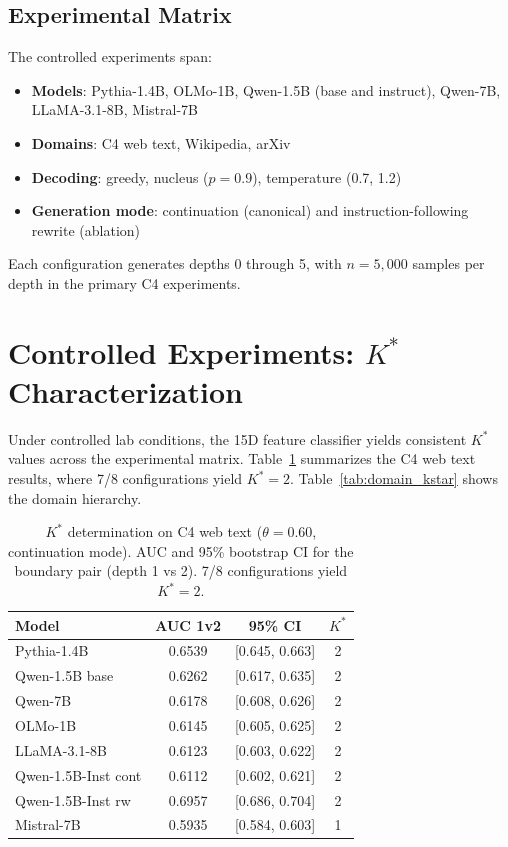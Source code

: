 \documentclass[11pt,a4paper]{article}
\begin{document}
\subsection{Experimental Matrix}

The controlled experiments span:
\begin{itemize}
    \item \textbf{Models}: Pythia-1.4B, OLMo-1B, Qwen-1.5B (base and instruct), Qwen-7B, LLaMA-3.1-8B, Mistral-7B
    \item \textbf{Domains}: C4 web text, Wikipedia, arXiv
    \item \textbf{Decoding}: greedy, nucleus ($p=0.9$), temperature (0.7, 1.2)
    \item \textbf{Generation mode}: continuation (canonical) and instruction-following rewrite (ablation)
\end{itemize}

Each configuration generates depths 0 through 5, with $n = 5{,}000$ samples per depth in the primary C4 experiments.


\section{Controlled Experiments: $K^*$ Characterization}

Under controlled lab conditions, the 15D feature classifier yields consistent $K^*$ values across the experimental matrix.
Table~\ref{tab:c4_kstar} summarizes the C4 web text results, where 7/8 configurations yield $K^*=2$.
Table~\ref{tab:domain_kstar} shows the domain hierarchy.

\begin{table}[t]
\centering
\caption{$K^*$ determination on C4 web text ($\theta = 0.60$, continuation mode). AUC and 95\% bootstrap CI for the boundary pair (depth 1 vs 2). 7/8 configurations yield $K^* = 2$.}
\label{tab:c4_kstar}
\small
\begin{tabular}{@{}lccc@{}}
\toprule
Model & AUC 1v2 & 95\% CI & $K^*$ \\
\midrule
Pythia-1.4B        & 0.6539 & [0.645, 0.663] & 2 \\
Qwen-1.5B base     & 0.6262 & [0.617, 0.635] & 2 \\
Qwen-7B            & 0.6178 & [0.608, 0.626] & 2 \\
OLMo-1B            & 0.6145 & [0.605, 0.625] & 2 \\
LLaMA-3.1-8B       & 0.6123 & [0.603, 0.622] & 2 \\
Qwen-1.5B-Inst cont& 0.6112 & [0.602, 0.621] & 2 \\
Qwen-1.5B-Inst rw  & 0.6957 & [0.686, 0.704] & 2 \\
\midrule
Mistral-7B         & 0.5935 & [0.584, 0.603] & 1 \\
\bottomrule
\end{tabular}
\end{table}
\end{document}
